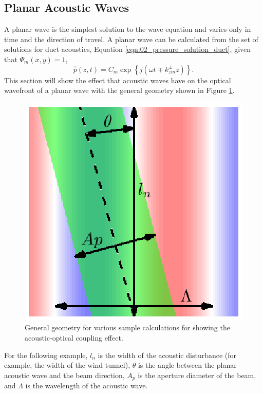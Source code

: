\subsection{Planar Acoustic Waves}
\label{sect:03_examples_planar}
A planar wave is the simplest solution to the wave equation and varies only in time and the direction of travel.
A planar wave can be calculated from the set of solutions for duct acoustics, Equation \ref{eqn:02_pressure_solution_duct}, given that $\Psi_m(x,y)=1$,
\begin{equation}
  \hat{p}(z,t) = C_m\exp\left\{j(\omega t \mp k_{zm}^\pm z)\right\} \textrm{.}
  \label{eqn:03_plane_wave}
\end{equation}
This section will show the effect that acoustic waves have on the optical wavefront of a planar wave with the general geometry shown in Figure \ref{fig:03_planar_sample_domain}.
\begin{figure}
  \centering
  \includegraphics{../matlab/03_aero_optics_acoustics/planar_sample_domain.eps}
  \caption{General geometry for various sample calculations for showing the acoustic-optical coupling effect.}
  \label{fig:03_planar_sample_domain}
\end{figure}
For the following example, $l_n$ is the width of the acoustic disturbance (for example, the width of the wind tunnel), $\theta$ is the angle between the planar acoustic wave and the beam direction, $A_p$ is the aperture diameter of the beam, and $\Lambda$ is the wavelength of the acoustic wave.

